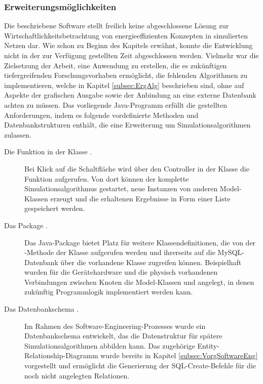 \subsubsection{Erweiterungsmöglichkeiten} \label{subsubsec:ErgSoftwErweiterung}
Die beschriebene Software stellt freilich keine abgeschlossene Lösung zur Wirtschaftlichkeitsbetrachtung von energieeffizienten Konzepten in simulierten Netzen dar. Wie schon zu Beginn des Kapitels erwähnt, konnte die Entwicklung nicht in der zur Verfügung gestellten Zeit abgeschlossen werden. Vielmehr war die Zielsetzung der Arbeit, eine Anwendung zu erstellen, die es zukünftigen tiefergreifenden Forschungsvorhaben ermöglicht, die fehlenden Algorithmen zu implementieren, welche in Kapitel \ref{subsec:ErgAlg} beschrieben sind, ohne auf Aspekte der grafischen Ausgabe sowie der Anbindung an eine externe Datenbank achten zu müssen.
Das vorliegende Java-Programm erfüllt die gestellten Anforderungen, indem es folgende vordefinierte Methoden und Datenbankstrukturen enthält, die eine Erweiterung um Simulationsalgorithmen zulassen.

\begin{description}
\item [Die Funktion  in der Klasse .] Bei Klick auf die Schaltfläche  wird über den Controller in der Klasse  die Funktion  aufgerufen. Von dort können der komplette Simulationsalgorithmus gestartet, neue Instanzen von anderen Model-Klassen erzeugt und die erhaltenen Ergebnisse in Form einer Liste gespeichert werden.
\item [Das Package .] Das Java-Package  bietet Platz für weitere Klassendefinitionen, die von der -Methode der Klasse  aufgerufen werden und ihrerseits auf die MySQL-Datenbank über die vorhandene Klasse  zugreifen können. Beispielhaft wurden für die Gerätehardware und die physisch vorhandenen Verbindungen zwischen Knoten die Model-Klassen  und  angelegt, in denen zukünftig Programmlogik implementiert werden kann.
\item [Das Datenbankschema .] Im Rahmen des Software-Engineering-Prozesses wurde ein Datenbankschema entwickelt, das die Datenstruktur für spätere Simulationsalgorithmen abbilden kann. Das zugehörige Entity-Relationship-Diagramm wurde bereits in Kapitel \ref{subsec:VorgSoftwareEng} vorgestellt und ermöglicht die Generierung der SQL-Create-Befehle für die noch nicht angelegten Relationen.
\end{description}

